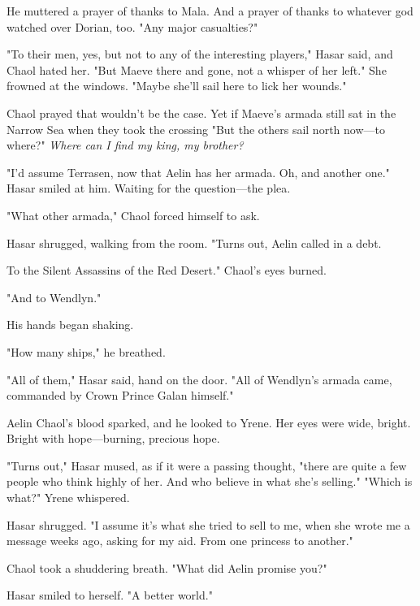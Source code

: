 He muttered a prayer of thanks to Mala. And a prayer of thanks to whatever god watched over Dorian, too. "Any major casualties?"

"To their men, yes, but not to any of the interesting players," Hasar said, and Chaol hated her. "But Maeve  there and gone, not a whisper of her left." She frowned at the windows. "Maybe she'll sail here to lick her wounds."

Chaol prayed that wouldn't be the case. Yet if Maeve's armada still sat in the Narrow Sea when they took the crossing  "But the others sail north now---to where?" \emph{Where can I find my king, my brother?}

"I'd assume Terrasen, now that Aelin has her armada. Oh, and another one." Hasar smiled at him. Waiting for the question---the plea.

"What other armada," Chaol forced himself to ask.

Hasar shrugged, walking from the room. "Turns out, Aelin called in a debt.

To the Silent Assassins of the Red Desert." Chaol's eyes burned.

"And to Wendlyn."

His hands began shaking.

"How many ships," he breathed.

"All of them," Hasar said, hand on the door. "All of Wendlyn's armada came, commanded by Crown Prince Galan himself."

Aelin  Chaol's blood sparked, and he looked to Yrene. Her eyes were wide, bright. Bright with hope---burning, precious hope.

"Turns out," Hasar mused, as if it were a passing thought, "there are quite a few people who think highly of her. And who believe in what she's selling." "Which is what?" Yrene whispered.

Hasar shrugged. "I assume it's what she tried to sell to me, when she wrote me a message weeks ago, asking for my aid. From one princess to another."

Chaol took a shuddering breath. "What did Aelin promise you?"

Hasar smiled to herself. "A better world."

